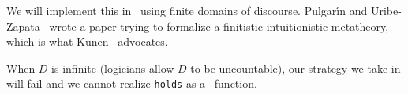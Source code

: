 \begin{node}\label{fol-000B}%
We will implement this in \SML\ using finite domains of discourse.
Pulgar\'{\i}n and Uribe-Zapata~\cite{pulgarin2023came} wrote a paper
trying to formalize a finitistic intuitionistic metatheory, which is
what Kunen~\cite{kunen2009foundations} advocates.

When $D$ is infinite (logicians allow $D$ to be uncountable), our
strategy we take in  will fail and we cannot realize
\texttt{holds} as a \SML\ function.
\end{node}
